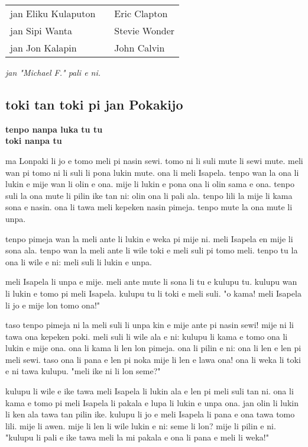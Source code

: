 \begin{supertabular}{p{5,5cm}|ll}
jan Eliku Kulaputon &&  Eric Clapton \\ 
jan Sipi Wanta  && Stevie Wonder \\ 
jan Jon Kalapin && John Calvin \\  
\end{supertabular}

\textit{jan "Michael F." pali e ni. \cite{www:failbluedot:01}}
%
\newpage
\subsection{toki tan toki pi jan Pokakijo}

\textbf{tenpo nanpa luka tu tu \\
toki nanpa tu}

ma Lonpaki li jo e tomo meli pi nasin sewi.
tomo ni li suli mute li sewi mute.
meli wan pi tomo ni li suli li pona lukin mute.
ona li meli Isapela.
tenpo wan la ona li lukin e mije wan li olin e ona.
mije li lukin e pona ona li olin sama e ona.
tenpo suli la ona mute li pilin ike tan ni: olin ona li pali ala.
tenpo lili la mije li kama sona e nasin.
ona li tawa meli kepeken nasin pimeja.
tenpo mute la ona mute li unpa.

tenpo pimeja wan la meli ante li lukin e weka pi mije ni.
meli Isapela en mije li sona ala.
tenpo wan la meli ante li wile toki e meli suli pi tomo meli.
tenpo tu la ona li wile e ni: meli suli li lukin e unpa.

meli Isapela li unpa e mije.
meli ante mute li sona li tu e kulupu tu.
kulupu wan li lukin e tomo pi meli Isapela.
kulupu tu li toki e meli suli.
"o kama!
meli Isapela li jo e mije lon tomo ona!"

taso tenpo pimeja ni la meli suli li unpa kin e mije ante pi nasin sewi!
mije ni li tawa ona kepeken poki.
meli suli li wile ala e ni: kulupu li kama e tomo ona li lukin e mije ona.
ona li kama li len lon pimeja.
ona li pilin e ni: ona li len e len pi meli sewi.
taso ona li pana e len pi noka mije li len e lawa ona!
ona li weka li toki e ni tawa kulupu.
"meli ike ni li lon seme?"

kulupu li wile e ike tawa meli Isapela li lukin ala e len pi meli suli
tan ni.
ona li kama e tomo pi meli Isapela li pakala e lupa li lukin e unpa ona.
jan olin li lukin li ken ala tawa tan pilin ike.
kulupu li jo e meli Isapela li pana e ona tawa tomo lili.
mije li awen.
mije li len li wile lukin e ni: seme li lon?
mije li pilin e ni.
"kulupu li pali e ike tawa meli la mi pakala e ona li pana e meli li weka!"

